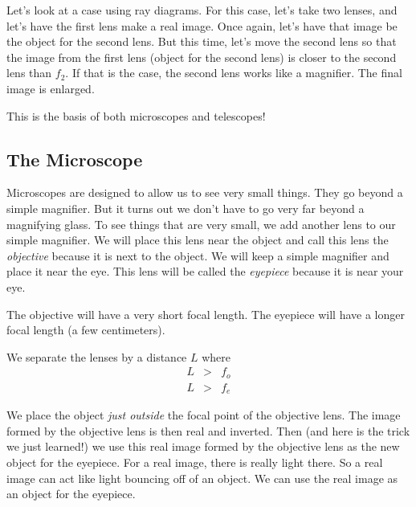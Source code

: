 \documentclass{article}
\begin{document}
Let's look at a case using ray diagrams. For this case, let's take two
lenses, and let's have the first lens make a real image. Once again, let's
have that image be the object for the second lens. But this time, let's move
the second lens so that the image from the first lens (object for the second
lens) is closer to the second lens than $f_{2}.$ If that is the case, the
second lens works like a magnifier. The final image is enlarged.

This is the basis of both
microscopes and telescopes!

\subsection{The Microscope}

Microscopes are designed to allow us to see very small things. They go
beyond a simple magnifier. But it turns out we don't have to go very far
beyond a magnifying glass. To see things that are very small, we add another
lens to our simple magnifier. We will place this lens near the object and
call this lens the \emph{objective} because it is next to the object. We
will keep a simple magnifier and place it near the eye. This lens will be
called the \emph{eyepiece} because it is near your eye.

The objective will have a very short focal length. The eyepiece will have a
longer focal length (a few centimeters).

We separate the lenses by a distance $L$ where 
\begin{eqnarray*}
L &>&f_{o} \\
L &>&f_{e}
\end{eqnarray*}

We place the object \emph{just outside} the focal point of the objective
lens. The image formed by the objective lens is then real and inverted. Then
(and here is the trick we just learned!) we use this real image formed by
the objective lens as the new object for the eyepiece. For a real image,
there is really light there. So a real image can act like light bouncing off
of an object. We can use the real image as an object for the eyepiece.
\end{document}
